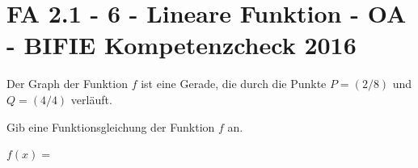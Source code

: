 \section{FA 2.1 - 6 - Lineare Funktion - OA - BIFIE Kompetenzcheck 2016}

\begin{beispiel}[FA 2.1]{1} %
				Der Graph der Funktion $f$ ist eine Gerade, die durch die Punkte $P=(2/8)$ und $Q=(4/4)$ verläuft.

Gib eine Funktionsgleichung der Funktion $f$ an.

$f(x)=$\,
\end{beispiel}	